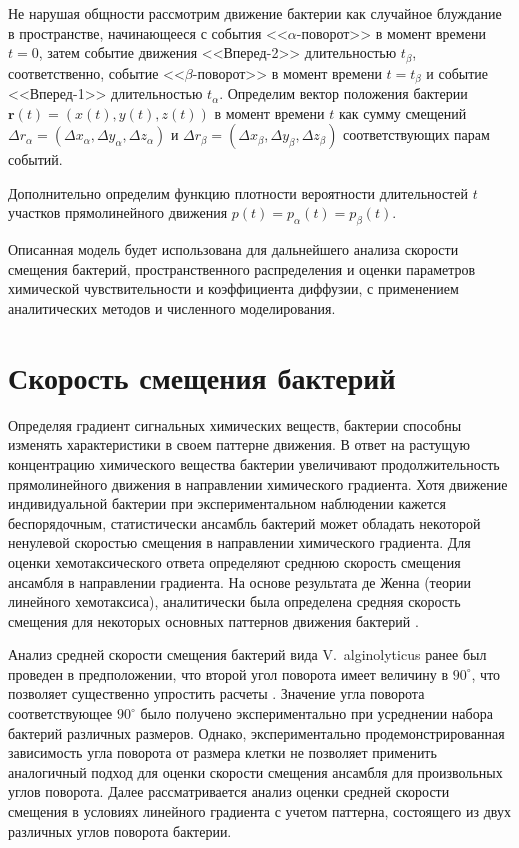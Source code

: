 Не нарушая общности рассмотрим движение бактерии как случайное блуждание в пространстве, начинающееся с события <<$\alpha$-поворот>> в момент времени $t=0$, затем событие движения <<Вперед-2>> длительностью $t_{\beta}$, соответственно, событие <<$\beta$-поворот>> в момент времени $t=t_{\beta}$ и событие <<Вперед-1>> длительностью $t_{\alpha}$. Определим вектор положения бактерии $\textbf{r}(t)=(x(t),y(t),z(t))$ в момент времени $t$ как сумму смещений $\Delta r_{\alpha}=(\Delta x_{\alpha},\Delta y_{\alpha},\Delta z_{\alpha})$ и $\Delta r_{\beta}=(\Delta x_{\beta},\Delta y_{\beta},\Delta z_{\beta})$ соответствующих парам событий. 

Дополнительно определим функцию плотности вероятности длительностей $t$ участков прямолинейного движения $p(t)=p_{\alpha}(t)=p_{\beta}(t)$. 

Описанная модель будет использована для дальнейшего анализа скорости смещения бактерий, пространственного распределения и оценки параметров химической чувствительности и коэффициента диффузии, с применением аналитических методов и численного моделирования. 

\section{Скорость смещения бактерий}\label{sec:ch2/sec3}

Определяя градиент сигнальных химических веществ, бактерии способны изменять характеристики в своем паттерне движения. В ответ на растущую концентрацию химического вещества бактерии увеличивают продолжительность прямолинейного движения в направлении химического градиента. Хотя движение индивидуальной бактерии при экспериментальном наблюдении кажется беспорядочным, статистически ансамбль бактерий может обладать некоторой ненулевой скоростью смещения в направлении химического градиента. Для оценки хемотаксического ответа определяют среднюю скорость смещения ансамбля в направлении градиента. На основе результата де Женна (теории линейного хемотаксиса), аналитически была определена средняя скорость смещения для некоторых основных паттернов движения бактерий \cite{taktikos_how_2013,de_gennes_chemotaxis_2004,locsei_persistence_2007}. 

Анализ средней скорости смещения бактерий вида V.~alginolyticus ранее был проведен в предположении, что второй угол поворота имеет величину в $90^\circ$, что позволяет существенно упростить расчеты \cite{taktikos_how_2013}. Значение угла поворота соответствующее $90^\circ$ было получено экспериментально при усреднении набора бактерий различных размеров. Однако, экспериментально продемонстрированная зависимость угла поворота от размера клетки \cite{taute_high-throughput_2015} не позволяет применить аналогичный подход для оценки скорости смещения ансамбля для произвольных углов поворота. Далее рассматривается анализ оценки средней скорости смещения в условиях линейного градиента с учетом паттерна, состоящего из двух различных углов поворота бактерии.

